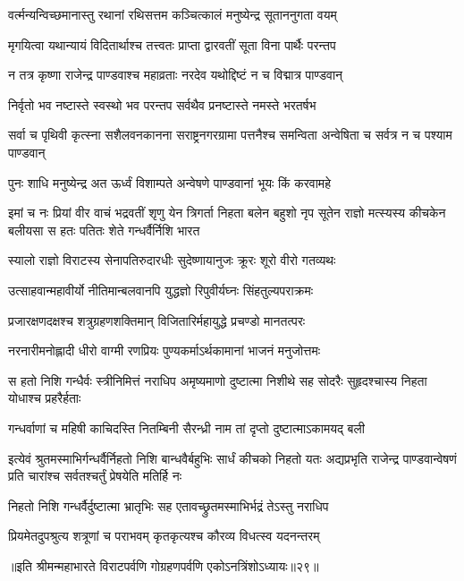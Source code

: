 \twolineshloka
{वर्त्मन्यन्विच्छमानास्तु रथानां रथिसत्तम}
{कञ्चित्कालं मनुष्येन्द्र सूताननुगता वयम्}


\twolineshloka
{मृगयित्वा यथान्यायं विदितार्थाश्च तत्त्वतः}
{प्राप्ता द्वारवतीं सूता विना पार्थैः परन्तप}


\twolineshloka
{न तत्र कृष्णा राजेन्द्र पाण्डवाश्च महाव्रताः}
{नरदेव यथोद्दिष्टं न च विद्मात्र पाण्डवान्}


\twolineshloka
{निर्वृतो भव नष्टास्ते स्वस्थो भव परन्तप}
{सर्वथैव प्रनष्टास्ते नमस्ते भरतर्षभ}


\threelineshloka
{सर्वा च पृथिवी कृत्स्ना सशैलवनकानना}
{सराष्ट्रनगरग्रामा पत्तनैश्च समन्विता}
{अन्वेषिता च सर्वत्र न च पश्याम पाण्डवान्}


\twolineshloka
{पुनः शाधि मनुष्येन्द्र अत ऊर्ध्वं विशाम्पते}
{अन्वेषणे पाण्डवानां भूयः किं करवामहे}


\onelineshloka
{इमां च नः प्रियां वीर वाचं भद्रवतीं शृणु}
\threelineshloka
{येन त्रिगर्ता निहता बलेन बहुशो नृप}
{सूतेन राज्ञो मत्स्यस्य कीचकेन बलीयसा}
{स हतः पतितः शेते गन्धर्वैर्निशि भारत}


\twolineshloka
{स्यालो राज्ञो विराटस्य सेनापतिरुदारधीः}
{सुदेष्णायानुजः क्रूरः शूरो वीरो गतव्यथः}


\twolineshloka
{उत्साहवान्महावीर्यो नीतिमान्बलवानपि}
{युद्धज्ञो रिपुवीर्यघ्नः सिंहतुल्यपराक्रमः}


\twolineshloka
{प्रजारक्षणदक्षश्च शत्रुग्रहणशक्तिमान्}
{विजितारिर्महायुद्धे प्रचण्डो मानतत्परः}


\twolineshloka
{नरनारीमनोह्लादी धीरो वाग्मी रणप्रियः}
{पुण्यकर्माऽर्थकामानां भाजनं मनुजोत्तमः}


\threelineshloka
{स हतो निशि गन्धैर्वः स्त्रीनिमित्तं नराधिप}
{अमृष्यमाणो दुष्टात्मा निशीथे सह सोदरैः}
{सुहृदश्चास्य निहता योधाश्च प्रहरैर्हताः}


\twolineshloka
{गन्धर्वाणां च महिषी काचिदस्ति नितम्बिनी}
{सैरन्ध्री नाम तां दृप्तो दुष्टात्माऽकामयद् बली}


\onelineshloka
{इत्येवं श्रुतमस्माभिर्गन्धर्वैर्निहतो निशि}
\threelineshloka
{बान्धवैर्बहुभिः सार्धं कीचको निहतो यतः}
{अद्यप्रभृति राजेन्द्र पाण्डवान्वेषणं प्रति}
{चारांश्च सर्वतश्चर्तुं प्रेषयेति मतिर्हि नः}


\twolineshloka
{निहतो निशि गन्धर्वैर्दुष्टात्मा भ्रातृभिः सह}
{एतावच्छ्रुतमस्माभिर्भद्रं तेऽस्तु नराधिप}


\twolineshloka
{प्रियमेतदुपश्रुत्य शत्रूणां च पराभवम्}
{कृतकृत्यश्च कौरव्य विधत्स्व यदनन्तरम्}

॥इति श्रीमन्महाभारते विराटपर्वणि गोग्रहणपर्वणि एकोऽनत्रिंशोऽध्यायः॥२९॥

